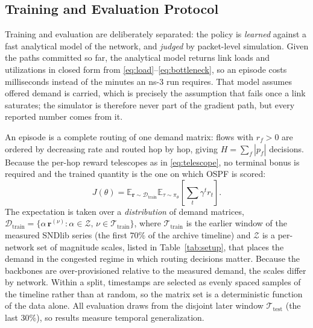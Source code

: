 \subsection{Training and Evaluation Protocol}
Training and evaluation are deliberately separated: the policy is \emph{learned} against a fast
analytical model of the network, and \emph{judged} by packet-level simulation. Given the paths
committed so far, the analytical model returns link loads and utilizations in closed form from
\eqref{eq:load}--\eqref{eq:bottleneck}, so an episode
costs milliseconds instead of the minutes an \mbox{ns-3} run requires. That model assumes offered
demand is carried, which is precisely the assumption that fails once a link saturates; the
simulator is therefore never part of the gradient path, but every reported number comes from it.

An episode is a complete routing of one demand matrix: flows with $r_f > 0$ are ordered by
decreasing rate and routed hop by hop, giving $H = \sum_f |p_f|$ decisions. Because the per-hop
reward telescopes as in \eqref{eq:telescope}, no terminal bonus is
required and the trained quantity is the one on which OSPF is scored:
\begin{equation}\label{eq:objective-rl}
J(\theta) = \mathbb{E}_{\mathbf{r} \sim \mathcal{D}_{\mathrm{train}}}
\mathbb{E}_{\tau \sim \pi_\theta}\!\left[\sum_{t} \gamma^{t} r_t\right].
\end{equation}
The expectation is taken over a \emph{distribution} of demand matrices,
$\mathcal{D}_{\mathrm{train}} = \{\alpha\,\mathbf{r}^{(\nu)} : \alpha \in \mathcal{Z},\,
\nu \in \mathcal{T}_{\mathrm{train}}\}$, where $\mathcal{T}_{\mathrm{train}}$ is the earlier window
of the measured SNDlib series (the first $70\%$ of the archive timeline) and $\mathcal{Z}$ is a
per-network set of magnitude scales, listed in Table~\ref{tab:setup}, that places the demand in
the congested regime in which routing decisions matter. Because the backbones are
over-provisioned relative to the measured demand, the scales differ by network. Within a split,
timestamps are selected as evenly spaced samples of the timeline rather than at random, so the
matrix set is a deterministic function of the data alone. All evaluation draws from the disjoint
later window $\mathcal{T}_{\mathrm{test}}$ (the last $30\%$), so results measure temporal
generalization.

